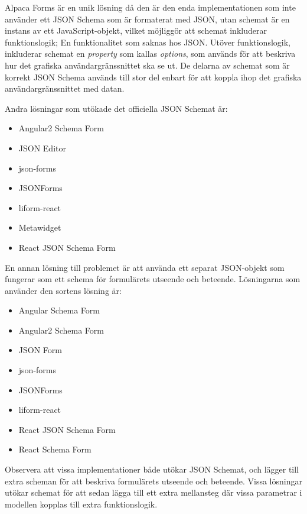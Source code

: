 Alpaca Forms är en unik lösning då den är den enda implementationen som inte använder ett JSON Schema som är formaterat med JSON, utan schemat är en instans av ett JavaScript-objekt, vilket möjliggör att schemat inkluderar funktionslogik; En funktionalitet som saknas hos JSON. Utöver funktionslogik, inkluderar schemat en \textit{property} som kallas \textit{options}, som används för att beskriva hur det grafiska användargränssnittet ska se ut. De delarna av schemat som är korrekt JSON Schema används till stor del enbart för att koppla ihop det grafiska användargränssnittet med datan. \cite{GitanaSoftwareInc.}

Andra lösningar som utökade det officiella JSON Schemat är:
\begin{itemize}
	\item Angular2 Schema Form \cite{MakinaCorpus}
	\item JSON Editor \cite{JeremyDorn}
	\item json-forms \cite{Brutusin.org}
	\item JSONForms \cite{EclipseSource}
	\item liform-react \cite{NachoMartin}
	\item Metawidget \cite{Metawidget}
	\item React JSON Schema Form \cite{MozillaServices}
\end{itemize}

En annan lösning till problemet är att använda ett separat JSON-objekt som fungerar som ett schema för formulärets utseende och beteende. Lösningarna som använder den sortens lösning är:
\begin{itemize}
	\item Angular Schema Form \cite{Textalk}
	\item Angular2 Schema Form \cite{MakinaCorpus}
	\item JSON Form \cite{Joshfire}
	\item json-forms \cite{Brutusin.org}
	\item JSONForms \cite{EclipseSource}
	\item liform-react \cite{NachoMartin}
	\item React JSON Schema Form \cite{MozillaServices}
	\item React Schema Form \cite{NetworkNewTechnologiesInc.}
\end{itemize}

Observera att vissa implementationer både utökar JSON Schemat, och lägger till extra scheman för att beskriva formulärets utseende och beteende. Vissa lösningar utökar schemat för att sedan lägga till ett extra mellansteg där vissa parametrar i modellen kopplas till extra funktionslogik.